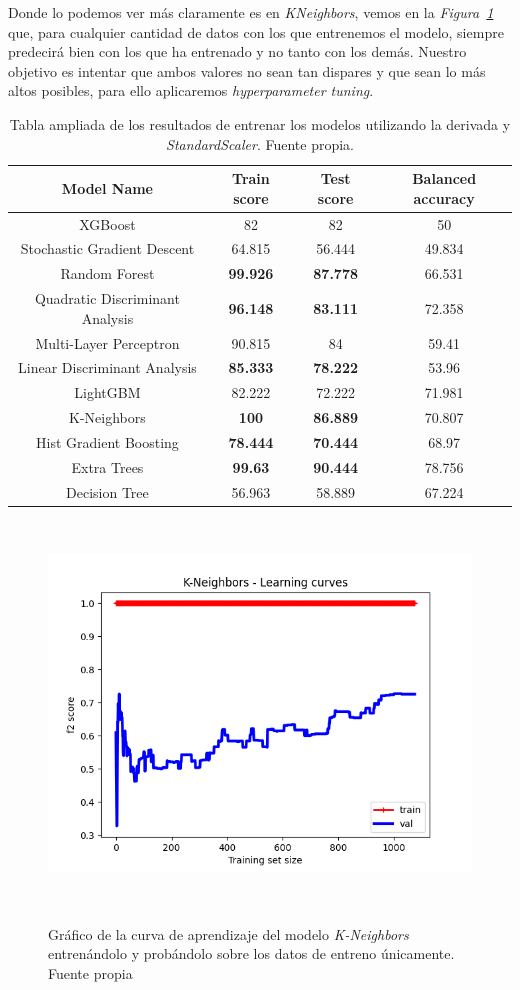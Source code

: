 Donde lo podemos ver más claramente es en \textit{KNeighbors}, vemos en la \textit{Figura\ \ref{fig:lc-knn}} que, para cualquier cantidad de datos con los que entrenemos el modelo, siempre predecirá bien con los que ha entrenado y no tanto con los demás. Nuestro objetivo es intentar que ambos valores no sean tan dispares y que sean lo más altos posibles, para ello aplicaremos \textit{hyperparameter tuning}.

\begin{table}[!ht]
    \centering
    \begin{tabular}{|c|ccc|}
    \hline
        Model Name & Train score & Test score & Balanced accuracy \\ \hline
        XGBoost & 82 & 82 & 50 \\ 
        Stochastic Gradient Descent & 64.815 & 56.444 & 49.834 \\ 
        Random Forest & \textbf{99.926} & \textbf{87.778} & 66.531 \\ 
        Quadratic Discriminant Analysis & \textbf{96.148} & \textbf{83.111} & 72.358 \\ 
        Multi-Layer Perceptron & 90.815 & 84 & 59.41 \\ 
        Linear Discriminant Analysis & \textbf{85.333} & \textbf{78.222} & 53.96 \\ 
        LightGBM & 82.222 & 72.222 & 71.981 \\ 
        K-Neighbors & \textbf{100} & \textbf{86.889} & 70.807 \\ 
        Hist Gradient Boosting & \textbf{78.444} & \textbf{70.444} & 68.97 \\ 
        Extra Trees & \textbf{99.63} & \textbf{90.444} & 78.756 \\ 
        Decision Tree & 56.963 & 58.889 & 67.224 \\
    \hline
    \end{tabular}
    \caption{Tabla ampliada de los resultados de entrenar los modelos utilizando la derivada y \textit{StandardScaler}. Fuente propia.}\ \label{tab:final-training-results}
\end{table}

\begin{figure}[!h]
    \centering
    \includegraphics[width=0.7\linewidth]{media/images/learing-curves-knn.png}
    \caption{Gráfico de la curva de aprendizaje del modelo \textit{K-Neighbors} entrenándolo y probándolo sobre los datos de entreno únicamente. Fuente propia}\ \label{fig:lc-knn}
\end{figure}

